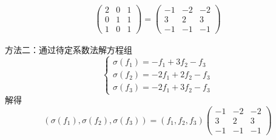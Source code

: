 \begin{exercise}
\begin{exgroup}
\begin{answer}
\begin{enumerate}
\begin{align*}
                          \begin{pmatrix}
                              2 & 0 & 1 \\
                              0 & 1 & 1 \\
                              1 & 0 & 1
                          \end{pmatrix}
                          = \begin{pmatrix}
                                -1 & -2 & -2 \\
                                3  & 2  & 3  \\
                                -1 & -1 & -1
                            \end{pmatrix}
                      \end{align*}

                      方法二：通过待定系数法解方程组
                      \[ \begin{cases}
                              \sigma(f_1) = -f_1 + 3 f_2 - f_3   \\
                              \sigma(f_2) = -2 f_1 + 2 f_2 - f_3 \\
                              \sigma(f_3) = -2 f_1 + 3 f_2 - f_3
                          \end{cases} \]
                      解得
                      \[ (\sigma(f_1), \sigma(f_2), \sigma(f_3)) = (f_1, f_2, f_3) \begin{pmatrix}
                              -1 & -2 & -2 \\
                              3  & 2  & 3  \\
                              -1 & -1 & -1
                          \end{pmatrix} \]


\end{enumerate}
\end{answer}
\end{exgroup}
\end{exercise}
